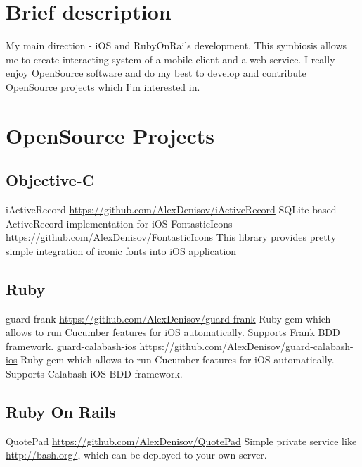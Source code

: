 \documentclass[11pt,a4paper]{moderncv}
\begin{document}
\maketitle

\section{Brief description}
\cvline
  {}
  {My main direction - iOS and RubyOnRails development.\newline{}
  This symbiosis allows me to create interacting system of a mobile client and a web service.\newline{}
  I really enjoy OpenSource software and do my best to develop and contribute OpenSource projects which I'm interested in.}

\section{OpenSource Projects}
\subsection{Objective-C}
\cvline
  {iActiveRecord}
  {\url{https://github.com/AlexDenisov/iActiveRecord}\newline{}
  SQLite-based ActiveRecord implementation for iOS}
\cvline
  {FontasticIcons}
  {\url{https://github.com/AlexDenisov/FontasticIcons}\newline{}
  This library provides pretty simple integration of iconic fonts into iOS
application}
\subsection{Ruby}
\cvline
  {guard-frank}
  {\url{https://github.com/AlexDenisov/guard-frank}\newline{}
  Ruby gem which allows to run Cucumber features for iOS automatically.
  \newline{}Supports Frank BDD framework.}
\cvline
  {guard-calabash-ios}
  {\url{https://github.com/AlexDenisov/guard-calabash-ios}\newline{}
  Ruby gem which allows to run Cucumber features for iOS automatically.
  \newline{}Supports Calabash-iOS BDD framework.}
\subsection{Ruby On Rails}
\cvline
  {QuotePad}
  {\url{https://github.com/AlexDenisov/QuotePad}\newline{}
  Simple private service like \url{http://bash.org/}, which can be deployed to your own server.}
\end{document}
